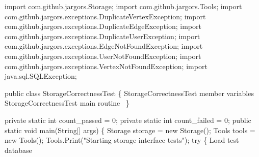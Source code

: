 \documentclass{article}
\def\nwendcode{\endtrivlist \endgroup}
\let\nwdocspar=\par
\begin{document}
\nwenddocs{}\endmoddef{}
import com.github.jargors.Storage;
import com.github.jargors.Tools;
import com.github.jargors.exceptions.DuplicateVertexException;
import com.github.jargors.exceptions.DuplicateEdgeException;
import com.github.jargors.exceptions.DuplicateUserException;
import com.github.jargors.exceptions.EdgeNotFoundException;
import com.github.jargors.exceptions.UserNotFoundException;
import com.github.jargors.exceptions.VertexNotFoundException;
import java.sql.SQLException;
\nwendcode{}\nwdocspar
\nwenddocs{}\endmoddef{}
public class StorageCorrectnessTest \{
  \LA{}\code{}StorageCorrectnessTest\edoc{} member variables~{\nwtagstyle{}}\RA{}
  \LA{}\code{}StorageCorrectnessTest\edoc{} main routine~{\nwtagstyle{}}\RA{}
\}
\nwendcode{}\nwdocspar
\nwenddocs{}\endmoddef{}
private static int count_passed = 0;
private static int count_failed = 0;
\eatline
{}\nwendcode{}\endmoddef{}
public static void main(String[] args) \{
  Storage storage = new Storage();
  Tools tools = new Tools();
  Tools.Print("Starting storage interface tests");
  try \{
    \LA{}Load test database~{\nwtagstyle{}}\RA{}
\end{document}
